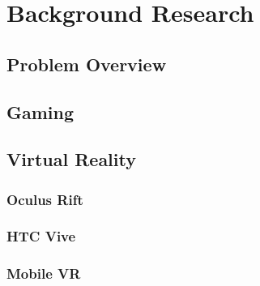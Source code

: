 \chapter{Background Research}
\label{chapter2}

\section{Problem Overview}
\lipsum[1-1] \cite{parikh1980adaptive}

\section{Gaming}
\lipsum[1-1] \cite{parikh1980adaptive}

\section{Virtual Reality}
\lipsum[1-1] \cite{parikh1980adaptive}

\subsection{Oculus Rift}
\lipsum[1-1] \cite{parikh1980adaptive}

\subsection{HTC Vive}
\lipsum[1-1] \cite{parikh1980adaptive}

\subsection{Mobile VR}
\lipsum[1-1] \cite{parikh1980adaptive}